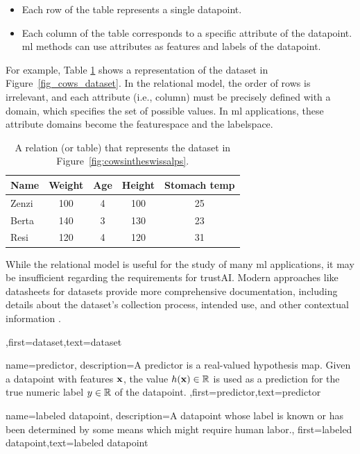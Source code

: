 {{\begin{itemize}
		\item Each row of the table represents a single \gls{datapoint}.
		\item Each column of the table corresponds to a specific attribute of the \gls{datapoint}. 
		\gls{ml} methods can use attributes as \gls{feature}s and \gls{label}s of the \gls{datapoint}.
		\end{itemize}
		For example, Table \ref{tab:cowdata} shows a representation of the dataset in Figure\ \ref{fig_cows_dataset}. 
		In the relational \gls{model}, the order of rows is irrelevant, and each attribute (i.e., column) must be 
		precisely defined with a domain, which specifies the set of possible values. In \gls{ml} applications, 
		these attribute domains become the \gls{featurespace} and the \gls{labelspace}.
		\begin{table}[H]
			\centering
			\begin{tabular}{lcccc}
				\hline
				\textbf{Name} & \textbf{Weight} & \textbf{Age} & \textbf{Height} & \textbf{Stomach temp} \\
				\hline
				Zenzi & 100 & 4 & 100 & 25 \\
				Berta & 140 & 3 & 130 & 23 \\
				Resi  & 120 & 4 & 120 & 31 \\
				\hline
			\end{tabular}
			\caption{A relation (or table) that represents the dataset in Figure\ \ref{fig:cowsintheswissalps}.}
			\label{tab:cowdata}
		\end{table}
 While the relational model is useful for the study of many \gls{ml} applications, it may be 
 insufficient regarding the requirements for \gls{trustAI}. Modern 
 approaches like datasheets for datasets provide more comprehensive 
 documentation, including details about the dataset’s collection process, intended 
 use, and other contextual information \cite{DatasheetData2021}.},first={dataset},text={dataset}  
}

{name={predictor},
	description={A predictor is a real-valued \gls{hypothesis} map. 
		Given a \gls{datapoint} with \gls{feature}s ${\bf x}$, the value 
		$h({\bf x}) \in \mathbb{R}$ is used as a \gls{prediction} for the true 
		numeric \gls{label} $y \in \mathbb{R}$ of the \gls{datapoint}. },first={predictor},text={predictor}  
}

{name={labeled datapoint},
 description={A \gls{datapoint} whose \gls{label} is known or has been determined 
 	by some means which might require human labor.},
 first={labeled datapoint},text={labeled datapoint}  
}

